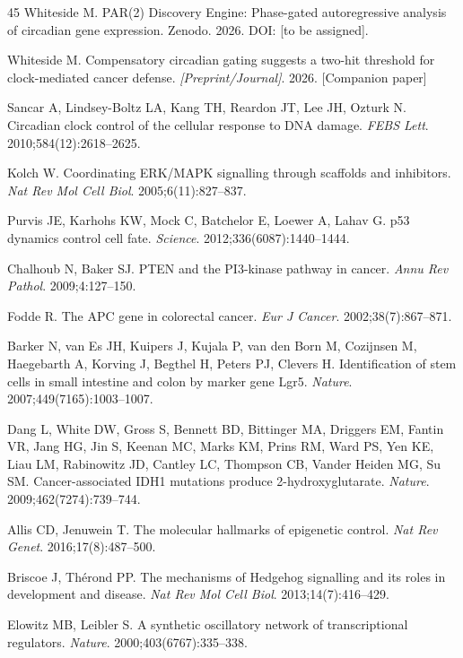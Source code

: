 \documentclass[11pt,letterpaper]{article}
\begin{document}
\begin{thebibliography}{45}
Whiteside M. PAR(2) Discovery Engine: Phase-gated autoregressive analysis of circadian gene expression. Zenodo. 2026. DOI: [to be assigned].

Whiteside M. Compensatory circadian gating suggests a two-hit threshold for clock-mediated cancer defense. \textit{[Preprint/Journal]}. 2026. [Companion paper]

Sancar A, Lindsey-Boltz LA, Kang TH, Reardon JT, Lee JH, Ozturk N. Circadian clock control of the cellular response to DNA damage. \textit{FEBS Lett}. 2010;584(12):2618--2625.

Kolch W. Coordinating ERK/MAPK signalling through scaffolds and inhibitors. \textit{Nat Rev Mol Cell Biol}. 2005;6(11):827--837.

Purvis JE, Karhohs KW, Mock C, Batchelor E, Loewer A, Lahav G. p53 dynamics control cell fate. \textit{Science}. 2012;336(6087):1440--1444.

Chalhoub N, Baker SJ. PTEN and the PI3-kinase pathway in cancer. \textit{Annu Rev Pathol}. 2009;4:127--150.

Fodde R. The APC gene in colorectal cancer. \textit{Eur J Cancer}. 2002;38(7):867--871.

Barker N, van Es JH, Kuipers J, Kujala P, van den Born M, Cozijnsen M, Haegebarth A, Korving J, Begthel H, Peters PJ, Clevers H. Identification of stem cells in small intestine and colon by marker gene Lgr5. \textit{Nature}. 2007;449(7165):1003--1007.

Dang L, White DW, Gross S, Bennett BD, Bittinger MA, Driggers EM, Fantin VR, Jang HG, Jin S, Keenan MC, Marks KM, Prins RM, Ward PS, Yen KE, Liau LM, Rabinowitz JD, Cantley LC, Thompson CB, Vander Heiden MG, Su SM. Cancer-associated IDH1 mutations produce 2-hydroxyglutarate. \textit{Nature}. 2009;462(7274):739--744.

Allis CD, Jenuwein T. The molecular hallmarks of epigenetic control. \textit{Nat Rev Genet}. 2016;17(8):487--500.

Briscoe J, Th\'erond PP. The mechanisms of Hedgehog signalling and its roles in development and disease. \textit{Nat Rev Mol Cell Biol}. 2013;14(7):416--429.

Elowitz MB, Leibler S. A synthetic oscillatory network of transcriptional regulators. \textit{Nature}. 2000;403(6767):335--338.


\end{thebibliography}
\end{document}
